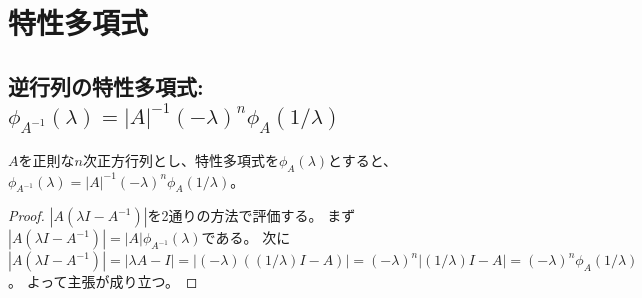 \chapter{特性多項式}
    \section{逆行列の特性多項式: \texorpdfstring{$\phi_{A^{-1}}(\lambda) = |A|^{-1}(-\lambda)^n\phi_A(1/\lambda)$}{φA\string^(-1)(λ) = |A|\string^(-1)\string^n φA(1/λ)}}
        \begin{shadebox}
            $A$を正則な$n$次正方行列とし、特性多項式を$\phi_A(\lambda)$とすると、$\phi_{A^{-1}}(\lambda) = |A|^{-1}(-\lambda)^n\phi_A(1/\lambda)$。
        \end{shadebox}
        \begin{proof}
            \quad\par
            $|A(\lambda I - A^{-1})|$を2通りの方法で評価する。
            まず$|A(\lambda I - A^{-1})| = |A|\phi_{A^{-1}}(\lambda)$である。
            次に$|A(\lambda I - A^{-1})| = |\lambda A - I| = |(-\lambda)((1/\lambda)I - A)| = (-\lambda)^n|(1/\lambda)I - A| = (-\lambda)^n\phi_A(1/\lambda)$。
            よって主張が成り立つ。
        \end{proof}